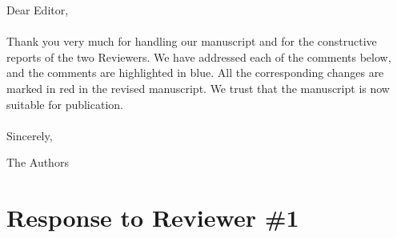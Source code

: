 \documentclass[aps,prb,onecolumn,nofootinbib,citeautoscript,10pt]{revtex4-2}
\begin{document}
\noindent Dear Editor,\\
\\ \noindent Thank you very much for handling our manuscript and for the constructive reports of the two Reviewers. We have addressed each of the comments below, and the comments are highlighted in blue. All the corresponding changes are marked in red in the revised manuscript. We trust that the manuscript is now suitable for publication.
\\\\ \noindent Sincerely,

\noindent The Authors

\vspace{0.5 cm}

\section{Response to Reviewer \#1}
\end{document}
